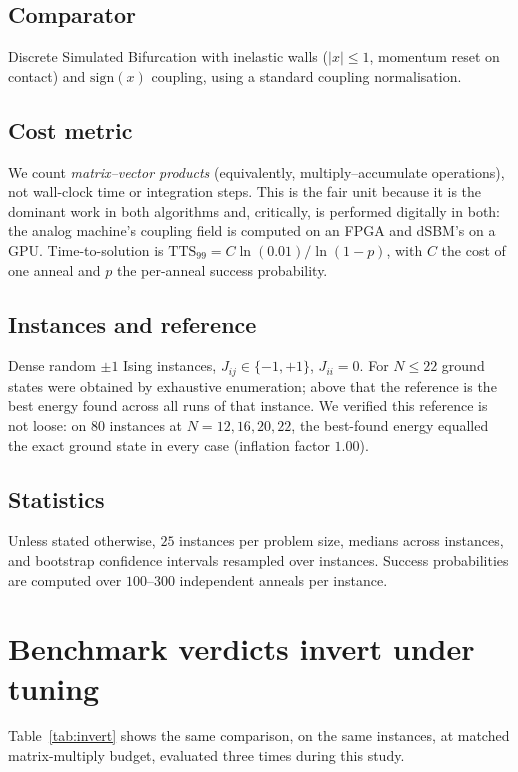 \documentclass[11pt]{article}
\begin{document}
\subsection{Comparator}
Discrete Simulated Bifurcation \cite{goto2021} with inelastic walls
($|x|\le 1$, momentum reset on contact) and $\mathrm{sign}(x)$ coupling, using a
standard coupling normalisation.

\subsection{Cost metric}
We count \emph{matrix--vector products} (equivalently, multiply--accumulate
operations), not wall-clock time or integration steps. This is the fair unit
because it is the dominant work in both algorithms and, critically, is performed
digitally in both: the analog machine's coupling field is computed on an FPGA and
dSBM's on a GPU. Time-to-solution is
$\mathrm{TTS}_{99}=C\ln(0.01)/\ln(1-p)$, with $C$ the cost of one anneal and $p$
the per-anneal success probability.

\subsection{Instances and reference}
Dense random $\pm1$ Ising instances, $J_{ij}\in\{-1,+1\}$, $J_{ii}=0$. For
$N\le22$ ground states were obtained by exhaustive enumeration; above that the
reference is the best energy found across all runs of that instance. We verified
this reference is not loose: on $80$ instances at $N=12,16,20,22$, the
best-found energy equalled the exact ground state in every case (inflation factor
$1.00$).

\subsection{Statistics}
Unless stated otherwise, $25$ instances per problem size, medians across
instances, and bootstrap confidence intervals resampled over instances. Success
probabilities are computed over $100$--$300$ independent anneals per instance.

\section{Benchmark verdicts invert under tuning}
\label{sec:tuning}

Table~\ref{tab:invert} shows the same comparison, on the same instances, at
matched matrix-multiply budget, evaluated three times during this study.
\end{document}

